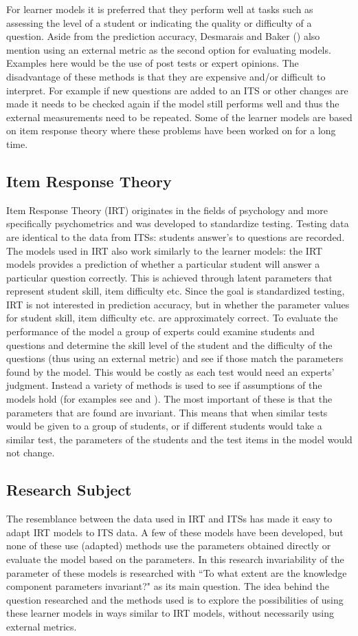 \documentclass{scrartcl}
\begin{document}
For learner models it is preferred that they perform well at tasks such as assessing the level of a student or indicating the quality or difficulty of a question. Aside from the prediction accuracy, Desmarais and Baker (\cite{modelreview}) also mention using an external metric as the second option for evaluating models. Examples here would be the use of post tests or expert opinions. The disadvantage of these methods is that they are expensive and/or difficult to interpret. For example if new questions are added to an ITS or other changes are made it needs to be checked again if the model still performs well and thus the external measurements need to be repeated. Some of the learner models are based on item response theory where these problems have been worked on for a long time.

\subsection{Item Response Theory}
Item Response Theory (IRT) originates in the fields of psychology and more specifically psychometrics and was developed to standardize testing. Testing data are identical to the data from ITSs: students answer's to questions are recorded. The models used in IRT also work similarly to the learner models: the IRT models provides a prediction of whether a particular student will answer a particular question correctly. This is achieved through latent parameters that represent student skill, item difficulty etc. Since the goal is standardized testing, IRT is not interested in prediction accuracy, but in whether the parameter values for student skill, item difficulty etc. are approximately correct. To evaluate the performance of the model a group of experts could examine students and questions and determine the skill level of the student and the difficulty of the questions (thus using an external metric) and see if those match the parameters found by the model. This would be costly as each test would need an experts' judgment. Instead a variety of methods is used to see if assumptions of the models hold (for examples see \cite{hambleton} and \cite{newirt}). The most important of these is that the parameters that are found are invariant. This means that when similar tests would be given to a group of students, or if different students would take a similar test, the parameters of the students and the test items in the model would not change.

\subsection{Research Subject}
The resemblance between the data used in IRT and ITSs has made it easy to adapt IRT models to ITS data. A few of these models have been developed, but none of these use (adapted) methods use the parameters obtained directly or evaluate the model based on the parameters. In this research invariability of the parameter of these models is researched with ``To what extent are the knowledge component parameters invariant?" as its main question. The idea behind the question researched and the methods used is to explore the possibilities of using these learner models in ways similar to IRT models, without necessarily using external metrics.
\end{document}
